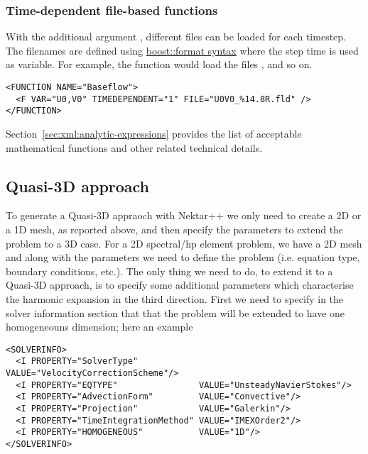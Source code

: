 \subsubsection{Time-dependent file-based functions}

With the additional argument , different files can be
loaded for each timestep. The filenames are defined using
\href{http://www.boost.org/doc/libs/1_56_0/libs/format/doc/format.html#syntax}{boost::format
  syntax} where the step time is used as variable. For example, the function
 would load the files ,
 and so on.

\begin{lstlisting}[style=XMLStyle]
<FUNCTION NAME="Baseflow">
  <F VAR="U0,V0" TIMEDEPENDENT="1" FILE="U0V0_%14.8R.fld" />
</FUNCTION>
\end{lstlisting}

Section~\ref{sec:xml:analytic-expressions} provides the list of acceptable
mathematical functions and other related technical details.

\subsection{Quasi-3D approach}

To generate a Quasi-3D appraoch with Nektar++ we only need to create a 2D or a
1D mesh, as reported above, and then specify the parameters to extend the
problem to a 3D case. For a 2D spectral/hp element problem, we have a 2D mesh
and along with the parameters we need to define the problem (i.e. equation type,
boundary conditions, etc.). The only thing we need to do, to extend it to a
Quasi-3D approach, is to specify some additional parameters which characterise
the harmonic expansion in the third direction. First we need to specify in the
solver information section that that the problem will be extended to have one
homogeneouns dimension; here an example

\begin{lstlisting}[style=XMLStyle]
<SOLVERINFO>
  <I PROPERTY="SolverType"            VALUE="VelocityCorrectionScheme"/>
  <I PROPERTY="EQTYPE"                VALUE="UnsteadyNavierStokes"/>
  <I PROPERTY="AdvectionForm"         VALUE="Convective"/>
  <I PROPERTY="Projection"            VALUE="Galerkin"/>
  <I PROPERTY="TimeIntegrationMethod" VALUE="IMEXOrder2"/>
  <I PROPERTY="HOMOGENEOUS"           VALUE="1D"/>
</SOLVERINFO>
\end{lstlisting}

